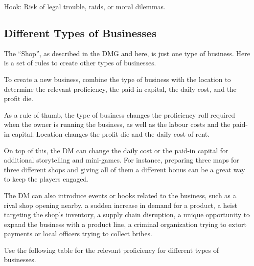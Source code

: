 \documentclass[twocolumn]{dndbook}
\begin{document}
Hook: Risk of legal trouble, raids, or moral dilemmas.\par

\subsection{Different Types of Businesses}

The ``Shop'', as described in the DMG and here, is just one type of business.
Here is a set of rules to create other types of businesses.

\begin{emphasisParagraph}
	To create a new business, combine the type of business with the location to determine
	the relevant proficiency, the paid-in capital, the daily cost,
	and the profit die.
\end{emphasisParagraph}

As a rule of thumb, the type of business changes the proficiency roll required when the owner is running the business,
as well as the labour costs and the paid-in capital.
Location changes the profit die and the daily cost of rent.\par

On top of this, the DM can change the daily cost or the paid-in capital for additional storytelling and mini-games.
For instance, preparing three maps for three different shops and
giving all of them a different bonus can be a great way to keep the
players engaged.\par

The DM can also introduce events or hooks related to the business,
such as a rival shop opening nearby, a sudden increase in demand for a product,
a heist targeting the shop's inventory, a supply chain disruption,
a unique opportunity to expand the business with a product line,
a criminal organization trying to extort payments or local officers
trying to collect bribes.\par

Use the following table for the relevant proficiency for different types of businesses.
\end{document}

